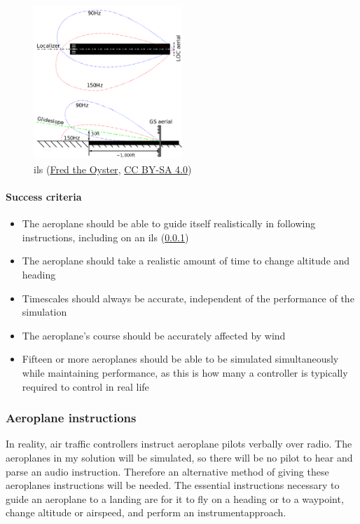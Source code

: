 \documentclass{article}
\begin{document}
\begin{figure}[H]
\centering
\includegraphics[width=0.5\textwidth]{context/ils.png}
\caption{\label{fig:ils}\acrfull{ils} (\href{https://commons.wikimedia.org/wiki/User:Fred_the_Oyster}{Fred the Oyster}, \href{https://creativecommons.org/licenses/by-sa/4.0/deed.en}{CC BY-SA 4.0})}
\end{figure}

\paragraph{Success criteria}
\begin{itemize}
    \item The aeroplane should be able to guide itself realistically in following instructions, including on an \acrshort{ils} (\ref{aeroplaneinstructions})
    \item The aeroplane should take a realistic amount of time to change altitude and heading
    \item Timescales should always be accurate, independent of the performance of the simulation
    \item The aeroplane's course should be accurately affected by wind
    \item Fifteen or more aeroplanes should be able to be simulated simultaneously while maintaining performance, as this is how many a controller is typically required to control in real life
\end{itemize}

\subsubsection{Aeroplane instructions} \label{aeroplaneinstructions}
In reality, air traffic controllers instruct aeroplane pilots verbally over radio.
The aeroplanes in my solution will be simulated, so there will be no pilot to hear and parse an audio instruction.
Therefore an alternative method of giving these aeroplanes instructions will be needed.
The essential instructions necessary to guide an aeroplane to a landing are for it to fly on a \gls{heading} or to a \gls{waypoint}, change altitude or \gls{airspeed}, and perform an \gls{instrumentapproach}.
\end{document}
